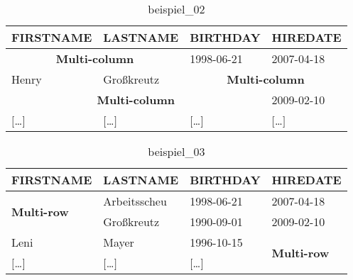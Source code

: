 \begin{table}[H]
  \begin{tabularx}{\textwidth}{X|X|X|X}
    \textbf{FIRSTNAME} & \textbf{LASTNAME} & \textbf{BIRTHDAY} & \textbf{HIREDATE} \\
    \hline\hline
    \multicolumn{2}{c|}{\textbf{Multi-column}} & 1998-06-21 & 2007-04-18 \\
    Henry & Großkreutz & \multicolumn{2}{c}{\textbf{Multi-column}} \\
    \multicolumn{3}{c|}{\textbf{Multi-column}} & 2009-02-10 \\
    $[$\dots$]$ & $[$\dots$]$ & $[$\dots$]$ & $[$\dots$]$ \\
  \end{tabularx}
  \caption{beispiel\_02}
  \label{tbl:beispiel_02}
\end{table}

\begin{table}[H]
  \begin{tabularx}{\textwidth}{X|X|X|X}
    \textbf{FIRSTNAME} & \textbf{LASTNAME} & \textbf{BIRTHDAY} & \textbf{HIREDATE} \\
    \hline\hline
    \multirow{2}{*}{\textbf{Multi-row}} & Arbeitsscheu & 1998-06-21 & 2007-04-18 \\
    & Großkreutz & 1990-09-01 & 2009-02-10 \\
    Leni & Mayer & 1996-10-15 & \multirow{2}{*}{\textbf{Multi-row}} \\
    $[$\dots$]$ & $[$\dots$]$ & $[$\dots$]$ & \\
    \hline
  \end{tabularx}
  \caption{beispiel\_03}
  \label{tbl:beispiel_03}
\end{table}